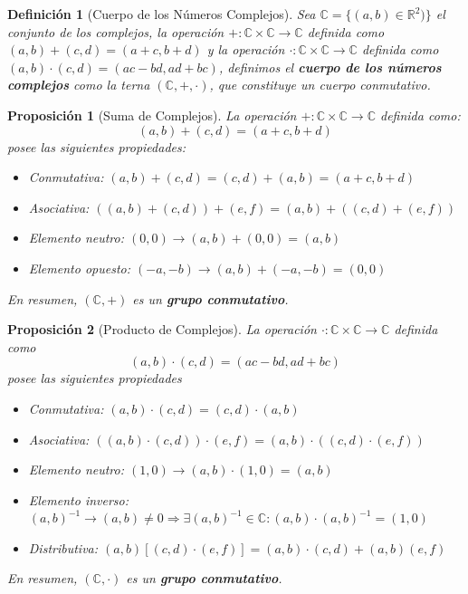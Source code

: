 \documentclass[10pt,a4paper,openright]{book}
\theoremstyle{break}
\newtheorem{defi}{Definición}[chapter]
\newtheorem{prop}{Proposición}[chapter]
\begin{document}
\begin{defi}[Cuerpo de los Números Complejos]
Sea $\mathbb C=\{(a,b)\in \mathbb{R}^2)\}$ el conjunto de los complejos, la operación $+: \mathbb{C}\times \mathbb{C}\rightarrow \mathbb{C}$ definida como $(a,b) + (c,d) = (a+c, b+d)$ y la operación $\cdot : \mathbb{C}\times \mathbb{C}\rightarrow \mathbb{C}$ definida como $(a,b)\cdot (c,d)=(ac-bd,ad+bc)$, definimos el \textbf{cuerpo de los números complejos} como la terna $(\mathbb{C}, +, \cdot)$, que constituye un cuerpo conmutativo.
\end{defi}

\begin{prop}[Suma de Complejos]
La operación $+: \mathbb{C}\times \mathbb{C} \rightarrow \mathbb{C}$ definida como:
$$(a,b)+(c,d)=(a+c,b+d)$$
posee las siguientes propiedades:
\begin{itemize}
\item Conmutativa: $(a,b)+(c,d)=(c,d)+(a,b)=(a+c,b+d)$
\item Asociativa: $\left((a,b)+(c,d)\right)+(e,f)=(a,b)+\left((c,d)+(e,f)\right)$
\item Elemento neutro: $(0,0)\rightarrow (a,b)+(0,0)=(a,b)$
\item Elemento opuesto: $(-a,-b)\rightarrow (a,b)+(-a,-b)=(0,0)$
\end{itemize}
En resumen, $(\mathbb C, +)$ es un \textbf{grupo conmutativo}.
\end{prop}

\begin{prop}[Producto de Complejos]
La operación $\cdot : \mathbb{C} \times \mathbb{C} \rightarrow \mathbb{C}$ definida como
\[
(a,b)\cdot (c,d)=(ac-bd,ad+bc)
\]
posee las siguientes propiedades
\begin{itemize}
\item Conmutativa: $(a,b)\cdot (c,d)=(c,d)\cdot (a,b)$
\item Asociativa: $\left((a,b)\cdot(c,d)\right)\cdot (e,f)=(a,b)\cdot \left((c,d)\cdot (e,f)\right)$
\item Elemento neutro: $(1,0)\rightarrow (a,b)\cdot (1,0)=(a,b)$
\item Elemento inverso: $(a,b)^{-1}\rightarrow (a,b)\neq 0\Rightarrow \exists (a,b)^{-1}\in \mathbb C: (a,b)\cdot (a,b)^{-1}=(1,0)$
\item Distributiva: $(a,b)[(c,d)\cdot(e,f)]=(a,b)\cdot (c,d)+(a,b)(e,f)$
\end{itemize}
En resumen, $(\mathbb C, \cdot)$ es un \textbf{grupo conmutativo}.
\end{prop}
\end{document}
